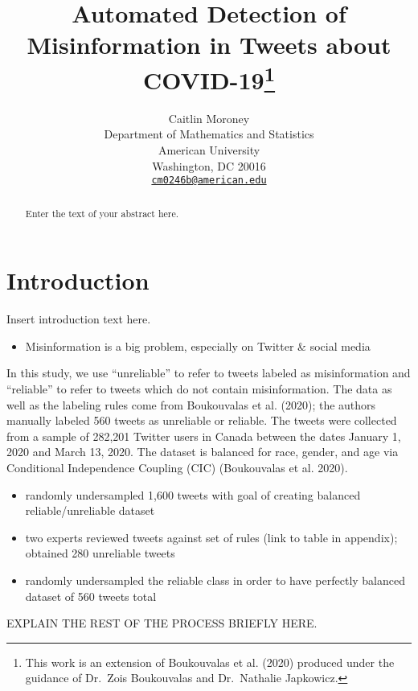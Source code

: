 \documentclass{article}
\title{Automated Detection of Misinformation in Tweets about COVID-19\footnote{This
  work is an extension of Boukouvalas et al. (2020) produced under the
  guidance of Dr.~Zois Boukouvalas and Dr.~Nathalie Japkowicz.}}
\author{
    Caitlin Moroney
   \\
    Department of Mathematics and Statistics \\
    American University \\
  Washington, DC 20016 \\
  \texttt{\href{mailto:cm0246b@american.edu}{\nolinkurl{cm0246b@american.edu}}} \\
  }
\begin{document}
\maketitle

\def\tightlist{}


\begin{abstract}
Enter the text of your abstract here.
\end{abstract}


\newpage

\hypertarget{introduction}{%
\section{Introduction}\label{introduction}}

Insert introduction text here.

\begin{itemize}
\tightlist
\item
  Misinformation is a big problem, especially on Twitter \& social media
\end{itemize}

In this study, we use ``unreliable'' to refer to tweets labeled as
misinformation and ``reliable'' to refer to tweets which do not contain
misinformation. The data as well as the labeling rules come from
Boukouvalas et al. (2020); the authors manually labeled 560 tweets as
unreliable or reliable. The tweets were collected from a sample of
282,201 Twitter users in Canada between the dates January 1, 2020 and
March 13, 2020. The dataset is balanced for race, gender, and age via
Conditional Independence Coupling (CIC) (Boukouvalas et al. 2020).

\begin{itemize}
\tightlist
\item
  randomly undersampled 1,600 tweets with goal of creating balanced
  reliable/unreliable dataset
\item
  two experts reviewed tweets against set of rules (link to table in
  appendix); obtained 280 unreliable tweets
\item
  randomly undersampled the reliable class in order to have perfectly
  balanced dataset of 560 tweets total
\end{itemize}

EXPLAIN THE REST OF THE PROCESS BRIEFLY HERE.
\end{document}
